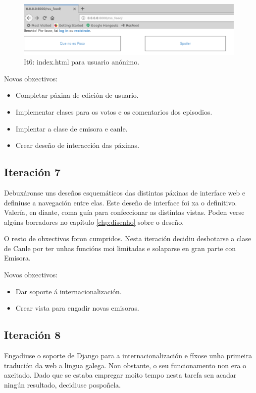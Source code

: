 \begin{figure}[h]
	\centering
	\includegraphics[scale=0.5,keepaspectratio=true]{./images/it6_anon.png}
	\caption{It6: index.html para usuario anónimo.}
	\label{fig:it6_anon}
\end{figure}

Novos obxectivos:
\begin{itemize}
	\item Completar páxina de edición de usuario.
	\item Implementar clases para os votos e os comentarios dos episodios.
	\item Implentar a clase de emisora e canle.
	\item Crear deseño de interacción das páxinas.
\end{itemize}

\subsection{Iteración 7}

Debuxáronse uns deseños esquemáticos das distintas páxinas de interface web e definiuse a navegación entre elas. Este deseño de interface foi xa o definitivo. Valería, en diante, coma guía para confeccionar as distintas vistas. Poden verse algúns borradores no capítulo \ref{chp:disenho} sobre o deseño.

O resto de obxectivos foron cumpridos. Nesta iteración decidiu desbotarse a clase de Canle por ter unhas funcións moi limitadas e solaparse en gran parte con Emisora.

Novos obxectivos:
\begin{itemize}
	\item Dar soporte á internacionalización.
	\item Crear vista para engadir novas emisoras.
\end{itemize}


\subsection{Iteración 8}

Engadiuse o soporte de Django para a internacionalización e fíxose unha primeira tradución da web a lingua galega. Non obstante, o seu funcionamento non era o axeitado. Dado que se estaba empregar moito tempo nesta tarefa sen acadar ningún resultado, decidiuse pospoñela.

